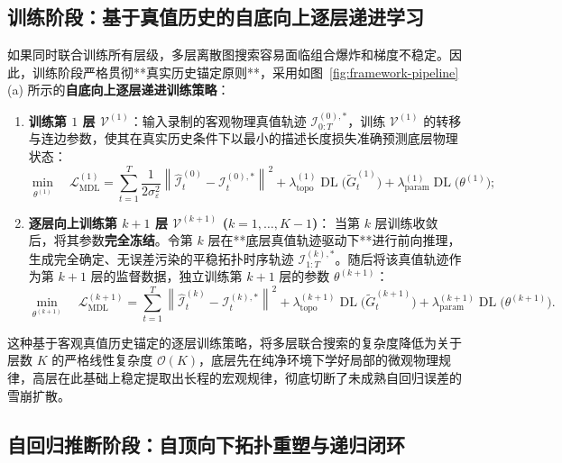 \documentclass[11pt,a4paper]{article}
\numberwithin{equation}{section}
\theoremstyle{definition}
\theoremstyle{remark}
\DeclareMathOperator{\DL}{\mathrm{DL}}     %
\begin{document}
	\subsection{训练阶段：基于真值历史的自底向上逐层递进学习}
	
	如果同时联合训练所有层级，多层离散图搜索容易面临组合爆炸和梯度不稳定。因此，训练阶段严格贯彻**真实历史锚定原则**，采用如图~\ref{fig:framework-pipeline}(a) 所示的\textbf{自底向上逐层递进训练策略}：
	\begin{enumerate}[label=\textbf{步骤 \arabic*:}, leftmargin=4.2em]
		\item \textbf{训练第 $1$ 层 $\mathcal{V}^{(1)}$}：输入录制的客观物理真值轨迹 $\mathcal{I}_{0:T}^{(0),\ast}$，训练 $\mathcal{V}^{(1)}$ 的转移与连边参数，使其在真实历史条件下以最小的描述长度损失准确预测底层物理状态：
		\begin{equation}
			\min_{\theta^{(1)}} \quad \mathcal{L}_{\text{MDL}}^{(1)} = \sum_{t=1}^T \frac{1}{2\sigma_\varepsilon^2} \left\| \widehat{\mathcal{I}}^{(0)}_t - \mathcal{I}^{(0),\ast}_t \right\|^2 + \lambda_{\text{topo}}^{(1)} \DL\bigl(\widetilde{G}_{t}^{(1)}\bigr) + \lambda_{\text{param}}^{(1)} \DL\bigl(\theta^{(1)}\bigr);
			\label{eq:mdl-layer-1}
		\end{equation}
		\item \textbf{逐层向上训练第 $k+1$ 层 $\mathcal{V}^{(k+1)}$ ($k = 1, \dots, K-1$)}：
		当第 $k$ 层训练收敛后，将其参数\textbf{完全冻结}。令第 $k$ 层在**底层真值轨迹驱动下**进行前向推理，生成完全确定、无误差污染的平稳拓扑时序轨迹 $\mathcal{I}_{1:T}^{(k),\ast}$。随后将该真值轨迹作为第 $k+1$ 层的监督数据，独立训练第 $k+1$ 层的参数 $\theta^{(k+1)}$：
		\begin{equation}
			\min_{\theta^{(k+1)}} \quad \mathcal{L}_{\text{MDL}}^{(k+1)} = \sum_{t=1}^T \left\| \widehat{\mathcal{I}}^{(k)}_t - \mathcal{I}^{(k),\ast}_t \right\|^2 + \lambda_{\text{topo}}^{(k+1)} \DL\bigl(\widetilde{G}_{t}^{(k+1)}\bigr) + \lambda_{\text{param}}^{(k+1)} \DL\bigl(\theta^{(k+1)}\bigr).
			\label{eq:mdl-layer-k}
		\end{equation}
	\end{enumerate}
	这种基于客观真值历史锚定的逐层训练策略，将多层联合搜索的复杂度降低为关于层数 $K$ 的严格线性复杂度 $\mathcal{O}(K)$，底层先在纯净环境下学好局部的微观物理规律，高层在此基础上稳定提取出长程的宏观规律，彻底切断了未成熟自回归误差的雪崩扩散。
	
	\subsection{自回归推断阶段：自顶向下拓扑重塑与递归闭环}
	
\end{document}
